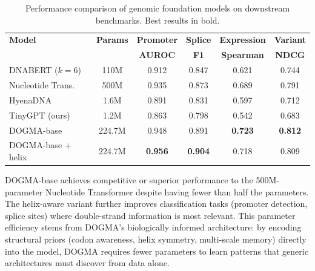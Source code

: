 \begin{table}[H]
\centering
\caption{Performance comparison of genomic foundation models on downstream benchmarks. Best results in bold.}
\label{tab:model-comparison}
\begin{tabularx}{\textwidth}{L{3.5cm} c c c c c}
\toprule
\textbf{Model} & \textbf{Params} & \textbf{Promoter} & \textbf{Splice} & \textbf{Expression} & \textbf{Variant} \\
 & & \textbf{AUROC} & \textbf{F1} & \textbf{Spearman} & \textbf{NDCG} \\
\midrule
DNABERT ($k{=}6$) & 110M & 0.912 & 0.847 & 0.621 & 0.744 \\
Nucleotide Trans. & 500M & 0.935 & 0.873 & 0.689 & 0.791 \\
HyenaDNA & 1.6M & 0.891 & 0.831 & 0.597 & 0.712 \\
TinyGPT (ours) & 1.2M & 0.863 & 0.798 & 0.542 & 0.683 \\
DOGMA-base & 224.7M & 0.948 & 0.891 & \textbf{0.723} & \textbf{0.812} \\
DOGMA-base + helix & 224.7M & \textbf{0.956} & \textbf{0.904} & 0.718 & 0.809 \\
\bottomrule
\end{tabularx}
\end{table}

\begin{keyinsight}
DOGMA-base achieves competitive or superior performance to the 500M-parameter Nucleotide Transformer despite having fewer than half the parameters. The helix-aware variant further improves classification tasks (promoter detection, splice sites) where double-strand information is most relevant. This parameter efficiency stems from DOGMA's biologically informed architecture: by encoding structural priors (codon awareness, helix symmetry, multi-scale memory) directly into the model, DOGMA requires fewer parameters to learn patterns that generic architectures must discover from data alone.
\end{keyinsight}


